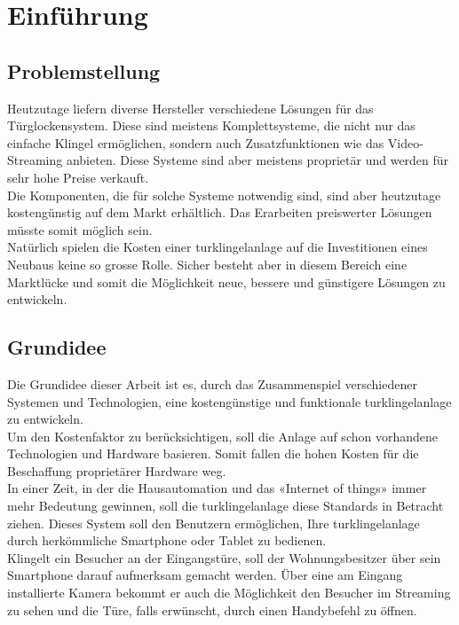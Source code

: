 \section{Einführung}
\label{sec:chapterexample}

\subsection{Problemstellung}
\label{sec:chapterexample}

Heutzutage liefern diverse Hersteller verschiedene Lösungen für das Türglockensystem. Diese sind meistens Komplettsysteme, die nicht nur das einfache Klingel ermöglichen, sondern auch Zusatzfunktionen wie das Video-Streaming anbieten. Diese Systeme sind aber meistens proprietär und werden für sehr hohe Preise verkauft.
\\
Die Komponenten, die für solche Systeme notwendig sind, sind aber heutzutage kostengünstig auf dem Markt erhältlich. Das Erarbeiten preiswerter Lösungen müsste somit möglich sein.
\\
Natürlich spielen die Kosten einer \gls{turklingelanlage} auf die Investitionen eines Neubaus keine so grosse Rolle. Sicher besteht aber in diesem Bereich eine Marktlücke und somit die Möglichkeit neue, bessere und günstigere Lösungen zu entwickeln.

\subsection{Grundidee}
\label{sec:grundidee}
Die Grundidee dieser Arbeit ist es, durch das Zusammenspiel verschiedener Systemen und Technologien, eine kostengünstige und funktionale \gls{turklingelanlage} zu entwickeln.
\\ 
Um den Kostenfaktor zu berücksichtigen, soll die Anlage auf schon vorhandene Technologien und Hardware basieren. Somit fallen die hohen Kosten für die Beschaffung proprietärer Hardware weg.
\\
In einer Zeit, in der die Hausautomation und das «Internet of things» immer mehr Bedeutung gewinnen, soll die \gls{turklingelanlage} diese Standards in Betracht ziehen. Dieses System soll den Benutzern ermöglichen, Ihre \gls{turklingelanlage} durch herkömmliche Smartphone oder Tablet zu bedienen.
\\
Klingelt ein Besucher an der Eingangstüre, soll der Wohnungsbesitzer über sein Smartphone darauf aufmerksam gemacht werden. Über eine am Eingang installierte Kamera  bekommt er auch die Möglichkeit den Besucher im Streaming zu sehen und die Türe, falls erwünscht, durch einen Handybefehl zu öffnen.
\newpage
